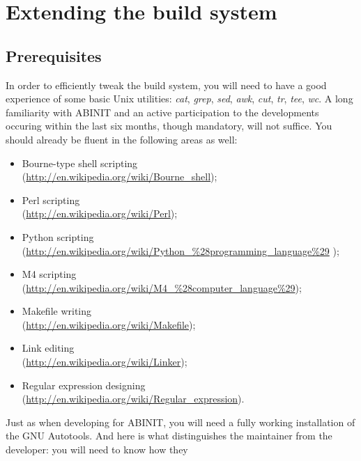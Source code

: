 
\chapter{Extending the build system}


\section{Prerequisites}

In order to efficiently tweak the build system, you will need to have
a good experience of some basic Unix utilities: \textit{cat}, \textit{grep},
\textit{sed}, \textit{awk}, \textit{cut}, \textit{tr}, \textit{tee},
\textit{wc}. A long familiarity with ABINIT and an active participation
to the developments occuring within the last six months, though mandatory,
will not suffice. You should already be fluent in the following areas
as well: 
\begin{itemize}
\item Bourne-type shell scripting \\
 (\url{http://en.wikipedia.org/wiki/Bourne_shell}); 
\item Perl scripting \\
 (\url{http://en.wikipedia.org/wiki/Perl}); 
\item Python scripting \\
 {\small (\url{http://en.wikipedia.org/wiki/Python_%28programming_language%29}
);}{\small \par}
\item {\small M4 scripting }\\
{\small{} (\url{http://en.wikipedia.org/wiki/M4_%28computer_language%29});}{\small \par}
\item Makefile writing\\
(\href{http://en.wikipedia.org/wiki/Makefile}{http://en.wikipedia.org/wiki/Makefile});
\item Link editing\\
(\href{http://en.wikipedia.org/wiki/Linker}{http://en.wikipedia.org/wiki/Linker});
\item Regular expression designing\\
(\href{http://en.wikipedia.org/wiki/Regular_expression}{http://en.wikipedia.org/wiki/Regular\_{}expression}).
\end{itemize}
Just as when developing for ABINIT, you will need a fully working
installation of the GNU Autotools. And here is what distinguishes
the maintainer from the developer: you will need to know how they
